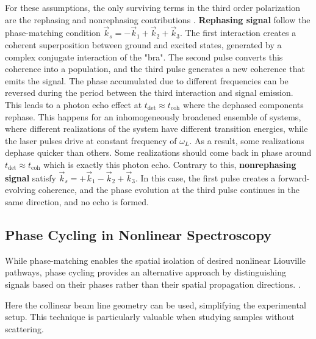 For these assumptions, the only surviving terms in the third order polarization are the rephasing and nonrephasing contributions \cite{cho2009twodimensionalopticalspectroscopy, jonas2003twodimensionalfemtosecondspectroscopy}.
\textbf{Rephasing signal} follow the phase-matching condition $\vec{k}_s = -\vec{k}_1 + \vec{k}_2 + \vec{k}_3$. The first interaction creates a coherent superposition between ground and excited states, generated by a complex conjugate interaction of the "bra". The second pulse converts this coherence into a population, and the third pulse generates a new coherence that emits the signal. The phase accumulated due to different frequencies can be reversed during the period between the third interaction and signal emission. This leads to a photon echo effect at $t_{\text{det}} \approx t_{\text{coh}}$ where the dephased components rephase.
This happens for an inhomogeneously broadened ensemble of systems, where different realizations of the system have different transition energies, while the laser pulses drive at constant frequency of $\omega_L$. As a result, some realizations dephase quicker than others. Some realizations should come back in phase around $t_{\text{det}} \approx t_{\text{coh}}$ which is exactly this photon echo.
Contrary to this, \textbf{nonrephasing signal} satisfy $\vec{k}_s = +\vec{k}_1 - \vec{k}_2 + \vec{k}_3$. In this case, the first pulse creates a forward-evolving coherence, and the phase evolution at the third pulse continues in the same direction, and no echo is formed.


\subsection{Phase Cycling in Nonlinear Spectroscopy}
\label{subsec:phase_cycling}

\noindent 
While phase-matching enables the spatial isolation of desired nonlinear Liouville pathways, phase cycling provides an alternative approach by distinguishing signals based on their phases rather than their spatial propagation directions. %
\cite{mukamel1995principlesnonlinearoptical, cho2009twodimensionalopticalspectroscopy, jonas2003twodimensionalfemtosecondspectroscopy, brixneretal2004phasestabilizedtwodimensionalelectronic, greenetal2024vibrationalcoherenceshalfbroadband}.

\noindent 
Here the collinear beam line geometry can be used, simplifying the experimental setup.
This technique is particularly valuable when studying samples without scattering.

